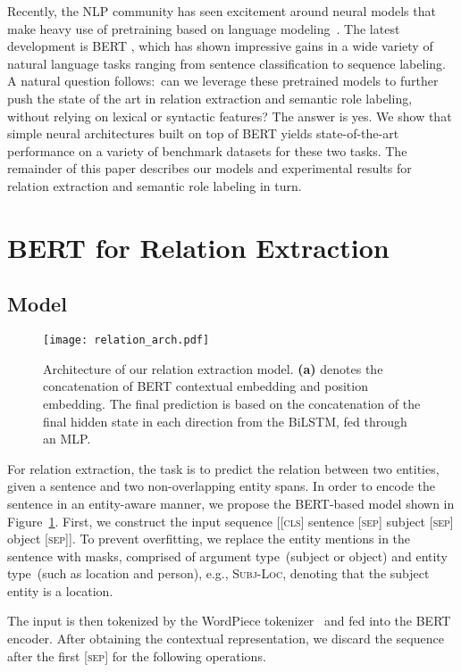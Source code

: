 \documentclass[11pt,a4paper]{article}
\begin{document}
Recently, the NLP community has seen excitement around neural models that make heavy use of pretraining based on language modeling~\cite{N18-1202,radford2018improving}.
The latest development is BERT \cite{devlin2018bert}, which has shown impressive gains in a wide variety of natural language tasks ranging from sentence classification to sequence labeling.
A natural question follows:\ can we leverage these pretrained models to further push the state of the art in relation extraction and semantic role labeling, without relying on lexical or syntactic features?
The answer is yes. 
We show that simple neural architectures built on top of BERT yields state-of-the-art performance on a variety of benchmark datasets for these two tasks.
The remainder of this paper describes our models and experimental results for relation extraction and semantic role labeling in turn.

\section{BERT for Relation Extraction}
\subsection{Model}


\begin{figure}[t]
	\centering
	\texttt{[image: relation\_arch.pdf]}
	\caption{Architecture of our relation extraction model.
\textbf{(a)} denotes the concatenation of BERT contextual embedding and position embedding.
The final prediction is based on the concatenation of the final hidden state in each direction from the BiLSTM, fed through an MLP.}
	\label{fig:relation_arch}
\end{figure}

For relation extraction, the task is to predict the relation between two entities, given a sentence and two non-overlapping entity spans. 
In order to encode the sentence in an entity-aware manner, we propose the BERT-based model shown in Figure~\ref{fig:relation_arch}.
First, we construct the input sequence [[\textsc{cls}] sentence [\textsc{sep}] subject [\textsc{sep}] object [\textsc{sep}]]. 
To prevent overfitting, we replace the entity mentions in the sentence with masks, comprised of argument type~(subject or object) and entity type~(such as location and person), e.g., \textsc{Subj-Loc}, denoting that the subject entity is a location.

The input is then tokenized by the WordPiece tokenizer~\cite{sennrich2015neural} and fed into the BERT encoder. 
After obtaining the contextual representation, we discard the sequence after the first [\textsc{sep}] for the following operations.
\end{document}
